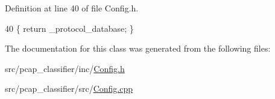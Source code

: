 Definition at line 40 of file Config.\-h.


\begin{DoxyCode}
40 \{ \textcolor{keywordflow}{return} \_protocol\_database; \}
\end{DoxyCode}


The documentation for this class was generated from the following files\-:\begin{DoxyCompactItemize}
\item 
src/pcap\-\_\-classifier/inc/\hyperlink{pcap__classifier_2inc_2_config_8h}{Config.\-h}\item 
src/pcap\-\_\-classifier/src/\hyperlink{pcap__classifier_2src_2_config_8cpp}{Config.\-cpp}\end{DoxyCompactItemize}
